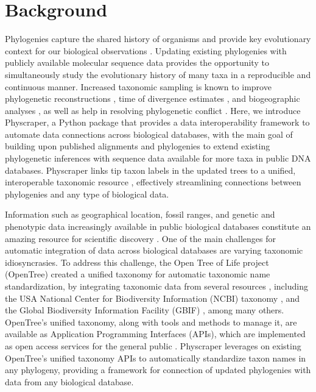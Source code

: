 \documentclass{bmcart}
\begin{document}

\section*{Background}
Phylogenies capture the shared history of organisms and provide key evolutionary
context for our biological observations \cite{dobzhansky1973nothing}.
Updating existing phylogenies with publicly available molecular sequence data provides
the opportunity to simultaneously study
the evolutionary history of many taxa in a reproducible and continuous manner.
Increased taxonomic sampling is known to improve
phylogenetic reconstructions \cite{hillis1996inferring, natsidis2019phylogenomics},
time of divergence estimates \cite{schulte2013undersampling, soares2015influence},
and biogeographic analyses \cite{kayaalp2017back},
as well as help in resolving phylogenetic conflict \cite{hedtke2006resolution, townsend2010optimal, natsidis2019phylogenomics}.
Here, we introduce Physcraper, a Python package that provides a data interoperability
framework to automate data connections across biological databases,
with the main goal of building upon published alignments and phylogenies
to extend existing phylogenetic inferences with sequence data available for more taxa
in public DNA databases.
Physcraper links tip taxon labels in the updated trees to a unified, interoperable
taxonomic resource \cite{rees2017automated}, effectively streamlining connections
between phylogenies and any type of biological data.

Information such as
geographical location, fossil ranges, and genetic and phenotypic data increasingly
available in public biological databases constitute an amazing
resource for scientific discovery \cite{baxevanis2015importance}.
One of the main challenges for automatic
integration of data across biological databases are varying taxonomic idiosyncrasies.
To address this challenge, the Open Tree of Life project (OpenTree)
created a unified taxonomy for automatic taxonomic name standardization, by integrating taxonomic
data from several resources \cite{rees2017automated}, including the USA National
Center for Biodiversity Information (NCBI) taxonomy \cite{federhen_ncbi_2012, schoch_ncbi_2020},
and the Global Biodiversity Information Facility (GBIF) \cite{gbif_secretariat_gbif_2019}, among many others.
OpenTree's unified taxonomy, along with tools and methods to manage it, are available
as Application Programming Interfaces (APIs),
which are implemented as open access services for the general public \cite{opentreeAPIs}.
Physcraper leverages on existing OpenTree's unified taxonomy APIs to automatically
standardize taxon names in any phylogeny, providing
a framework for connection of updated phylogenies with data from any biological database.
\end{document}
